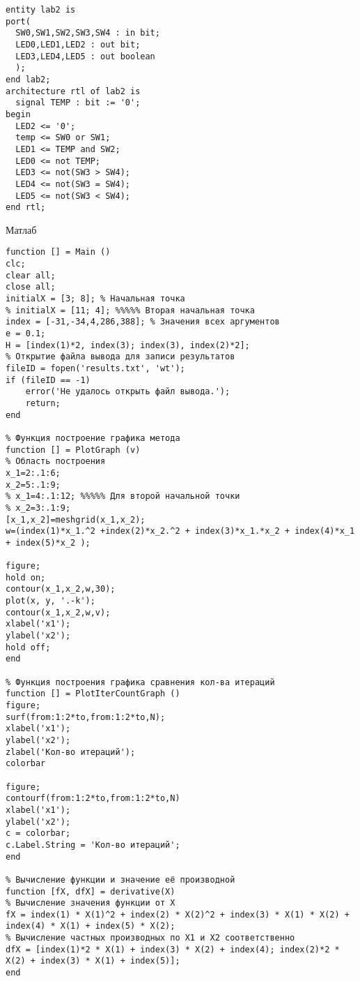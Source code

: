 \documentclass{beamer}
\begin{document}
\begin{frame}[fragile]
  \lstset{style=vhdl}
\begin{lstlisting}[label=lst:VHDL,caption=Описание схемы]
entity lab2 is
port(
  SW0,SW1,SW2,SW3,SW4 : in bit;
  LED0,LED1,LED2 : out bit;
  LED3,LED4,LED5 : out boolean
  );
end lab2;
architecture rtl of lab2 is
  signal TEMP : bit := '0';
begin
  LED2 <= '0';
  temp <= SW0 or SW1;
  LED1 <= TEMP and SW2;
  LED0 <= not TEMP;
  LED3 <= not(SW3 > SW4);
  LED4 <= not(SW3 = SW4);
  LED5 <= not(SW3 < SW4);
end rtl;
\end{lstlisting}

\end{frame}

\begin{frame}{Матлаб}
  \lstset{style=matlab}
\begin{lstlisting}[label=lst:VHDL,caption=Описание схемы]
function [] = Main ()
clc;
clear all;                     
close all;
initialX = [3; 8]; % Начальная точка  
% initialX = [11; 4]; %%%%% Вторая начальная точка  
index = [-31,-34,4,286,388]; % Значения всех аргументов
e = 0.1;                    
H = [index(1)*2, index(3); index(3), index(2)*2];         
% Открытие файла вывода для записи результатов
fileID = fopen('results.txt', 'wt');
if (fileID == -1)
    error('Не удалось открыть файл вывода.');
    return;
end

% Функция построение графика метода
function [] = PlotGraph (v)
% Область построения
x_1=2:.1:6;
x_2=5:.1:9;
% x_1=4:.1:12; %%%%% Для второй начальной точки                 
% x_2=3:.1:9;
[x_1,x_2]=meshgrid(x_1,x_2);
w=(index(1)*x_1.^2 +index(2)*x_2.^2 + index(3)*x_1.*x_2 + index(4)*x_1 + index(5)*x_2 );

figure;
hold on;
contour(x_1,x_2,w,30);
plot(x, y, '.-k');
contour(x_1,x_2,w,v);
xlabel('x1');
ylabel('x2');
hold off;
end

% Функция построения графика сравнения кол-ва итераций
function [] = PlotIterCountGraph ()
figure;
surf(from:1:2*to,from:1:2*to,N);
xlabel('x1');
ylabel('x2');
zlabel('Кол-во итераций');
colorbar

figure;
contourf(from:1:2*to,from:1:2*to,N)
xlabel('x1');
ylabel('x2');
c = colorbar;
c.Label.String = 'Кол-во итераций';
end

% Вычисление функции и значение её производной
function [fX, dfX] = derivative(X) 
% Вычисление значения функции от Х
fX = index(1) * X(1)^2 + index(2) * X(2)^2 + index(3) * X(1) * X(2) + index(4) * X(1) + index(5) * X(2);
% Вычисление частных производных по Х1 и Х2 соответственно
dfX = [index(1)*2 * X(1) + index(3) * X(2) + index(4); index(2)*2 * X(2) + index(3) * X(1) + index(5)];
end
\end{lstlisting}

\end{frame}
\end{document}
